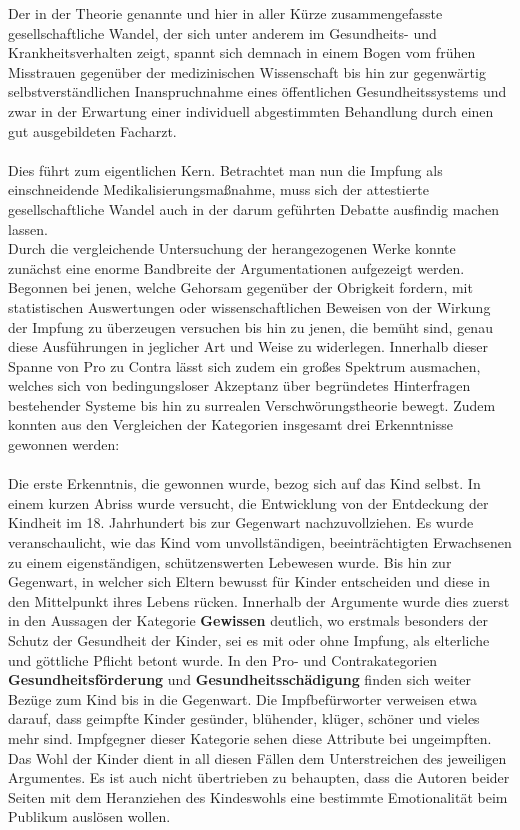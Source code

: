 \documentclass[
    a4paper,
    12pt,
    hyphens,
    chapterprefix=true,
    headheight=33pt,
    footheight=29pt,
    headings=optiontohead,
]{scrartcl}
\begin{document}
{Der in der Theorie genannte und hier in aller Kürze zusammengefasste gesellschaftliche Wandel, der sich unter anderem im Gesundheits- und Krankheitsverhalten zeigt, spannt sich demnach in einem Bogen vom frühen Misstrauen gegenüber der medizinischen Wissenschaft bis hin zur gegenwärtig selbstverständlichen Inanspruchnahme eines öffentlichen
Gesundheitssystems und zwar in der Erwartung einer individuell abgestimmten Behandlung
durch einen gut ausgebildeten Facharzt.\\
\\
Dies führt zum eigentlichen Kern. Betrachtet man nun die Impfung als einschneidende Medikalisierungsmaßnahme, muss sich der attestierte gesellschaftliche Wandel auch in der darum geführten Debatte ausfindig machen lassen. \\
Durch die vergleichende Untersuchung der herangezogenen Werke konnte zunächst eine enorme Bandbreite der Argumentationen aufgezeigt werden. Begonnen bei jenen, welche Gehorsam gegenüber der Obrigkeit fordern, mit statistischen Auswertungen oder wissenschaftlichen
Beweisen von der Wirkung der Impfung zu überzeugen versuchen bis hin zu jenen, die bemüht sind, genau diese Ausführungen in jeglicher Art und Weise zu widerlegen. Innerhalb dieser Spanne von Pro zu Contra
lässt sich zudem ein großes Spektrum ausmachen, welches sich von bedingungsloser Akzeptanz über begründetes Hinterfragen bestehender Systeme bis hin zu surrealen Verschwörungstheorie bewegt. Zudem konnten aus den Vergleichen der Kategorien insgesamt drei Erkenntnisse gewonnen werden:\\
\\
Die erste Erkenntnis, die gewonnen wurde, bezog sich auf das Kind selbst.
In einem kurzen Abriss wurde versucht, die Entwicklung von der Entdeckung der
Kindheit im 18. Jahrhundert bis zur Gegenwart nachzuvollziehen. Es wurde
veranschaulicht, wie das Kind vom unvollständigen, beeinträchtigten Erwachsenen zu
einem eigenständigen, schützenswerten Lebewesen wurde. Bis hin zur Gegenwart, in welcher sich
Eltern bewusst für Kinder entscheiden und diese in den Mittelpunkt ihres
Lebens rücken. Innerhalb der Argumente wurde dies zuerst in den Aussagen der Kategorie
\textbf{Gewissen} deutlich, wo erstmals besonders der
Schutz der Gesundheit der Kinder, sei es mit oder ohne Impfung, als
elterliche und göttliche Pflicht betont wurde. In den Pro- und Contrakategorien \textbf{Gesundheitsförderung} und \textbf{Gesundheitsschädigung} finden sich weiter Bezüge zum Kind bis in die Gegenwart. Die Impfbefürworter verweisen etwa darauf, dass geimpfte Kinder gesünder, blühender, klüger, schöner und vieles mehr sind. Impfgegner dieser Kategorie sehen diese Attribute bei ungeimpften. Das Wohl der Kinder dient in all diesen Fällen dem Unterstreichen des jeweiligen Argumentes. Es ist auch nicht übertrieben zu behaupten, dass die Autoren beider Seiten mit dem Heranziehen des Kindeswohls eine bestimmte Emotionalität beim Publikum auslösen wollen.\\
}
\end{document}
